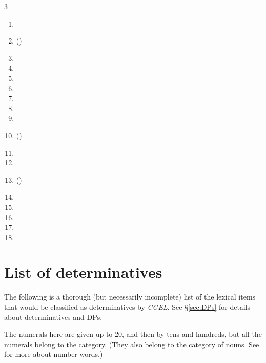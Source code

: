 \begin{multicols}{3}
\begin{enumerate}[noitemsep]
    \item {}
    \item {}()
    \item {}
    \item {}
    \item {}
    \item {}
    \item {}
    \item {}
    \item {}
    \item {}()
    \item {}
    \item {}
    \item {}()
    \item {}
    \item {}
    \item {}
    \item {}
    \item {}
\end{enumerate}
\end{multicols}


\chapter{List of determinatives}

The following is a thorough (but necessarily incomplete) list of the lexical items that would be classified as determinatives by \textit{CGEL}. See \S\ref{sec:DPs} for details about determinatives and DPs.

The numerals here are given up to 20, and then by tens and hundreds, but all the numerals belong to the category. (They also belong to the category of nouns. See \textcite{reynolds2026numerals} for more about number words.)

